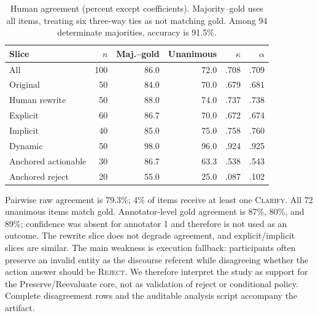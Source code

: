 \documentclass[10pt]{article}
\begin{document}
\begin{table}[h]
\centering
\small
\begin{tabular}{lrrrrr}
\toprule
Slice & $n$ & Maj.--gold & Unanimous & $\kappa$ & $\alpha$\\
\midrule
All & 100 & 86.0 & 72.0 & .708 & .709\\
Original & 50 & 84.0 & 70.0 & .679 & .681\\
Human rewrite & 50 & 88.0 & 74.0 & .737 & .738\\
Explicit & 60 & 86.7 & 70.0 & .672 & .674\\
Implicit & 40 & 85.0 & 75.0 & .758 & .760\\
Dynamic & 50 & 98.0 & 96.0 & .924 & .925\\
Anchored actionable & 30 & 86.7 & 63.3 & .538 & .543\\
Anchored reject & 20 & 55.0 & 25.0 & .087 & .102\\
\bottomrule
\end{tabular}
\caption{Human agreement (percent except coefficients). Majority--gold uses all items, treating
six three-way ties as not matching gold. Among 94 determinate majorities, accuracy is 91.5\%.}
\end{table}

Pairwise raw agreement is 79.3\%; 4\% of items receive at least one \textsc{Clarify}. All 72
unanimous items match gold. Annotator-level gold agreement is 87\%, 80\%, and 89\%; confidence
was absent for annotator 1 and therefore is not used as an outcome. The rewrite slice does not
degrade agreement, and explicit/implicit slices are similar. The main weakness is execution
fallback: participants often preserve an invalid entity as the discourse referent while
disagreeing whether the action answer should be \textsc{Reject}. We therefore interpret the
study as support for the Preserve/Reevaluate core, not as validation of reject or conditional
policy. Complete disagreement rows and the auditable analysis script accompany the artifact.
\end{document}
